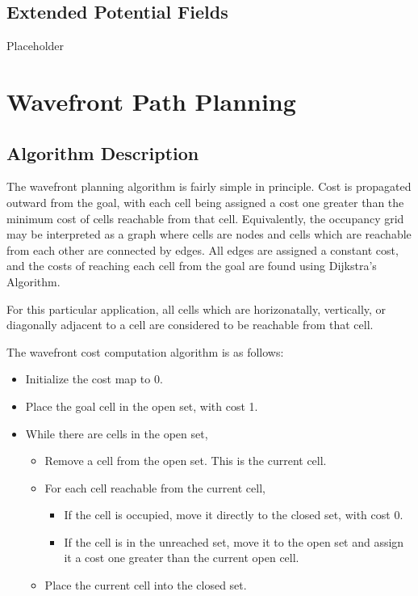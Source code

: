 \documentclass[11pt]{article} %
\begin{document}
\subsection{Extended Potential Fields}
Placeholder

\section{Wavefront Path Planning}

\subsection{Algorithm Description}
The wavefront planning algorithm is fairly simple in principle.  Cost is propagated outward from the goal, with each cell being assigned a cost one greater than the minimum cost of cells reachable from that cell.  Equivalently, the occupancy grid may be interpreted as a graph where cells are nodes and cells which are reachable from each other are connected by edges.  All edges are assigned a constant cost, and the costs of reaching each cell from the goal are found using Dijkstra's Algorithm.

For this particular application, all cells which are horizonatally, vertically, or diagonally adjacent to a cell are considered to be reachable from that cell.

The wavefront cost computation algorithm is as follows:

\begin{itemize}
 \item Initialize the cost map to 0.
 \item Place the goal cell in the open set, with cost 1.
 \item While there are cells in the open set, \begin{itemize}
  \item Remove a cell from the open set.  This is the current cell.
  \item For each cell reachable from the current cell, \begin{itemize}
    \item If the cell is occupied, move it directly to the closed set, with cost 0.
    \item If the cell is in the unreached set, move it to the open set and assign it a cost one greater than the current open cell.
  \end{itemize}
  \item Place the current cell into the closed set.
 \end{itemize}
\end{itemize}
\end{document}

